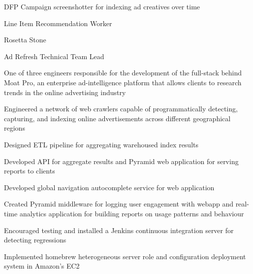 \documentclass[]{deedy-resume-openfont}
\begin{document}
    \begin{tightemize}
        \item
            DFP Campaign screenshotter for indexing ad creatives over time
        \item
            Line Item Recommendation Worker
        \item
            Rosetta Stone

        \item
            Ad Refresh Technical Team Lead
    \end{tightemize}
\sectionsep

    \begin{tightemize}
        \item
            One of three engineers responsible for the development of the
            full-stack behind Moat Pro, an enterprise ad-intelligence platform
            that allows clients to research trends in the online advertising
            industry
        \item
            Engineered a network of web crawlers capable of programmatically
            detecting, capturing, and indexing online advertisements across
            different geographical regions
        \item
            Designed ETL pipeline for aggregating warehoused index results
        \item
            Developed API for aggregate results and Pyramid web application for
            serving reports to clients
        \item
            Developed global navigation autocomplete service for web application
        \item
            Created Pyramid middleware for logging user engagement with
            webapp and real-time analytics application for building reports on
            usage patterns and behaviour
        \item
            Encouraged testing and installed a Jenkins continuous integration
            server for detecting regressions
        \item
            Implemented homebrew heterogeneous server role and configuration
            deployment system in Amazon’s EC2
    \end{tightemize}
\sectionsep
\end{document}
